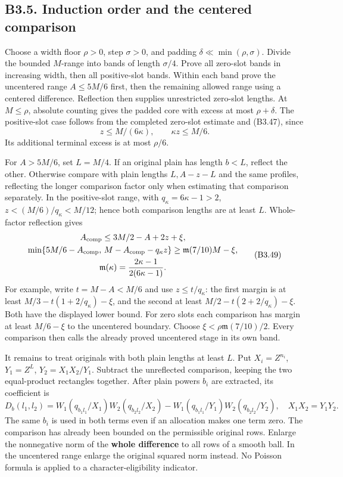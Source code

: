 \documentclass[11pt,a4paper]{article}
\begin{document}
\hypertarget{b3.5.-induction-order-and-the-centered-comparison}{%
\subsection{B3.5. Induction order and the centered
comparison}\label{b3.5.-induction-order-and-the-centered-comparison}}

Choose a width floor \(\rho>0\), step \(\sigma>0\), and padding
\(\delta\ll\min(\rho,\allowbreak{}\sigma)\). Divide the bounded \(M\)-range into
bands of length \(\sigma/4\). Prove all zero-slot bands in increasing
width, then all positive-slot bands. Within each band prove the
uncentered range \(A\le5M/6\) first, then the remaining allowed range
using a centered difference. Reflection then supplies unrestricted
zero-slot lengths. At \(M\le\rho\), absolute counting gives the padded
core with excess at most \(\rho+\delta\). The positive-slot case follows
from the completed zero-slot estimate and (B3.47), since \[
z\le M/(6\kappa),\qquad\kappa z\le M/6.
\tag{B3.48}
\] Its additional terminal excess is at most \(\rho/6\).

For \(A>5M/6\), set \(L=M/4\). If an original plain has length \(b<L\),
reflect the other. Otherwise compare with plain lengths \(L,\allowbreak{}A-z-L\) and
the same profiles, reflecting the longer comparison factor only when
estimating that comparison separately. In the positive-slot range, with
\(q_\kappa=6\kappa-1>2\), \(z<(M/6)/q_\kappa<M/12\); hence both
comparison lengths are at least \(L\). Whole-factor reflection gives \[
\begin{gathered}
A_{\rm comp}\le3M/2-A+2z+\xi,
\\
\min\{5M/6-A_{\rm comp},\,M-A_{\rm comp}-q_\kappa z\}
\ge \mathfrak m(7/10)M-\xi,
\\
\mathfrak m(\kappa)=\frac{2\kappa-1}{2(6\kappa-1)}.
\end{gathered}
\tag{B3.49}
\] For example, write \(t=M-A<M/6\) and use \(z\le t/q_\kappa\): the
first margin is at least \(M/3-t(1+2/q_\kappa)-\xi\), and the second at
least \(M/2-t(2+2/q_\kappa)-\xi\). Both have the displayed lower bound.
For zero slots each comparison has margin at least \(M/6-\xi\) to the
uncentered boundary. Choose \(\xi<\rho\mathfrak m(7/10)/2\). Every
comparison then calls the already proved uncentered stage in its own
band.

It remains to treat originals with both plain lengths at least \(L\).
Put \(X_i=Z^{n_i}\), \(Y_1=Z^L\), \(Y_2=X_1X_2/Y_1\). Subtract the
unreflected comparison, keeping the two equal-product rectangles
together. After plain powers \(b_i\) are extracted, its coefficient is
\[
D_b(l_1,l_2)=W_1(q_{b_1l_1}/X_1)W_2(q_{b_2l_2}/X_2)
 -W_1(q_{b_1l_1}/Y_1)W_2(q_{b_2l_2}/Y_2),
\quad X_1X_2=Y_1Y_2.
\tag{B3.50}
\] The same \(b_i\) is used in both terms even if an allocation makes
one term zero. The comparison has already been bounded on the
permissible original rows. Enlarge the nonnegative norm of the
\textbf{whole difference} to all rows of a smooth ball. In the
uncentered range enlarge the original squared norm instead. No Poisson
formula is applied to a character-eligibility indicator.
\end{document}

